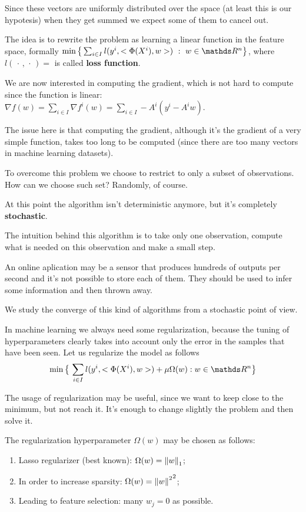 \documentclass[computational_mathematics.tex]{subfiles}
\begin{document}
Since these vectors are uniformly distributed over the space (at least this is our hypotesis) when they get summed we expect some of them to cancel out.

The idea is to rewrite the problem as learning a linear function in the feature space, formally $\min \big\{\sum_{i \in I} l(y^i,\ps{\Phi(X^i)}{w})~:~w \in \R^n \big\}$, where $l( \, \cdot \,,\, \cdot \, ) =$ is called \textbf{loss function}.

We are now interested in computing the gradient, which is not hard to compute since the function is linear: $\nabla f(w) = \sum_{i \in I} \nabla f^i(w) = \sum_{i \in I} -A^i (y^i - A^i w)$.

The issue here is that computing the gradient, although it's the gradient of a very simple function, takes too long to be computed (since there are too many vectors in machine learning datasets).

To overcome this problem we choose to restrict to only a subset of observations. How can we choose such set? Randomly, of course.

At this point the algorithm isn't deterministic anymore, but it's completely \textbf{stochastic}.

The intuition behind this algorithm is to take only one observation, compute what is needed on this observation and make a small step.

An online aplication may be a sensor that produces hundreds of outputs per second and it's not possible to store each of them. They should be used to infer some information and then thrown away.

We study the converge of this kind of algorithms from a stochastic point of view.

In machine learning we always need some regularization, because the tuning of hyperparameters clearly takes into account only the error in the samples that have been seen. Let us regularize the model as follows
\[
  \min \big\{ \, \sum\limits_{i \in I} l(y^i, \ps{\Phi(X^i)}{w}) + \mu \Omega(w) : w \in \R^n \big\}
\]

The usage of regularization may be useful, since we want to keep close to the minimum, but not reach it. It's enough to change slightly the problem and then solve it.

The regularization hyperparameter $\Omega(w)$ may be chosen as follows:

\begin{enumerate}
  \item Lasso regularizer (best known): $\Omega(w) = {\left\lVert w\right\rVert}_1$;
  \item In order to increase sparsity: $\Omega(w) = {{\left\lVert w\right\rVert}^2}^2$;
  \item Leading to feature selection: many $w_j = 0$ as possible.
\end{enumerate}
\end{document}
